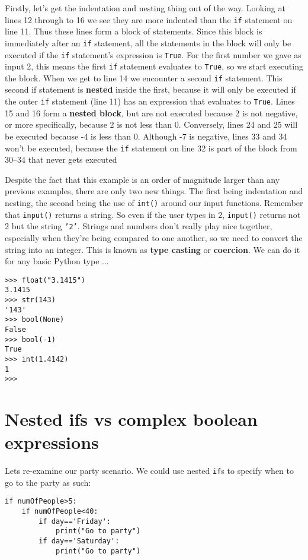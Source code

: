 Firstly, let's get the indentation and nesting thing out of the way.   Looking at lines 12 through to 16 we see they are more indented than   the \texttt{if} statement on line 11. Thus these lines form a block of   statements. Since this block is immediately after an \texttt{if} statement, all   the statements in the block will only be executed if the \texttt{if} statement's   expression is \texttt{True}. For the first number we gave as input 2, this means the first                 \texttt{if} statement evaluates to \texttt{True}, so we start executing the block. When we get to line 14 we   encounter a second \texttt{if} statement. This second if statement is   \textbf{nested} inside the first, because it will only be   executed if the outer \texttt{if} statement (line 11) has an expression that   evaluates to \texttt{True}. Lines 15 and 16 form a \textbf{nested   block}, but are not executed because 2 is not negative, or more   specifically, because 2 is not less than 0. Conversely, lines 24 and 25   will be executed because -4 is less than 0. Although -7 is negative, lines 33 and 34 won't be executed, because the \texttt{if} statement on line 32 is part of the block from 30--34 that never gets executed

Despite the fact that this example is an order of magnitude larger   than any previous examples, there are only two new things. The first   being indentation and nesting, the second being the use of   
\texttt{int()} around our input functions.  Remember that   \texttt{input()} returns a string. So even if the user types in 2,   \texttt{input()} returns not 2 but the string \texttt{'2'}. Strings and numbers don't   really play nice together, especially when they're being compared to   one another, so we need to convert the string into an integer. This is   known as \textbf{type casting} or \textbf{coercion}. We   can do it for any basic Python type ...
\begin{lstlisting}
>>> float("3.1415")
3.1415
>>> str(143)
'143'
>>> bool(None)
False
>>> bool(-1)
True
>>> int(1.4142)
1
>>>
\end{lstlisting}

\section{Nested ifs vs complex boolean expressions}

 Lets re-examine our party scenario. We could use nested \texttt{if}s to specify when to go to the party as such:
\begin{lstlisting}
if numOfPeople>5:
	if numOfPeople<40:
		if day=='Friday':
			print("Go to party")
		if day=='Saturday':
			print("Go to party")
\end{lstlisting}

